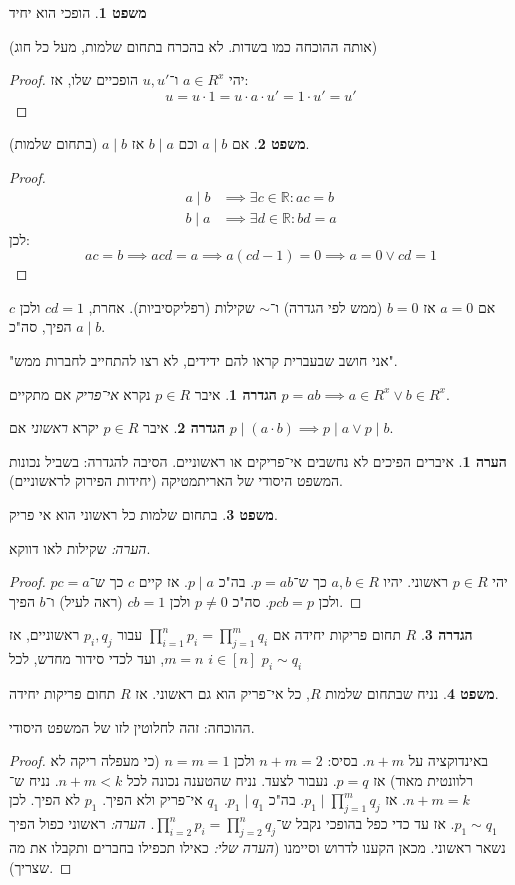 \documentclass[a4paper]{article}
\newcommand\R     {\mathbb{R}}
\newcommand\co        {\colon}
\theoremstyle{definition}
\newtheorem{Theorem}{משפט}
\newtheorem{definition}{הגדרה}
\newtheorem{Remark}{הערה}
\newcommand\theo  [1] {\begin{Theorem}#1\end{Theorem}}
\newcommand\defi  [1] {\begin{definition}#1\end{definition}}
\newcommand\rmark [1] {\begin{Remark}#1\end{Remark}}
\begin{document}
	
	\theo{הופכי הוא יחיד} (אותה ההוכחה כמו בשדות. לא בהכרח בתחום שלמות, מעל כל חוג)\begin{proof}
		יהי $a \in R^x$ ו־$u, u'$ הופכיים שלו, אז:
		\[ u = u \cdot 1 = u \cdot a \cdot u' = 1 \cdot u' = u' \]
	\end{proof}
	\theo{אם $a \mid b$ וכם $b \mid a$ אז $a \mid b$ (בתחום שלמות). }\begin{proof}
		\begin{align*}
			a \mid b &\implies \exists c \in \R \co ac = b \\
			b \mid a &\implies \exists d \in \R\co bd = a
		\end{align*}
		לכן: 
		\[ ac = b \implies acd = a \implies a(cd - 1) = 0 \implies a = 0 \lor cd = 1 \]
	\end{proof}
	אם $a = 0$ אז $b = 0$ (ממש לפי הגדרה) ו־$\sim$ שקילות (רפליקסיביות). אחרת, $cd = 1$ ולכן $c$ הפיך, סה"כ $a \mid b$. 
	
	"אני חושב שבעברית קראו להם ידידים, לא רצו להתחייב לחברות ממש". 
	
	
	\defi{איבר $p \in R$ נקרא \textit{אי־פריק} אם מתקיים $p = ab \implies a \in R^x \lor b \in R^x$. }
	
	\defi{איבר $p \in R$ יקרא \textit{ראשוני} אם $p \mid (a \cdot b) \implies p \mid a \lor p \mid b$. }
	\rmark{איברים הפיכים לא נחשבים אי־פריקים או ראשוניים. הסיבה להגדרה: בשביל נכונות המשפט היסודי של האריתמטיקה (יחידות הפירוק לראשוניים). }
	
	\theo{בתחום שלמות כל ראשוני הוא אי פריק. }
	\textit{הערה: }שקילות לאו דווקא. 
	\begin{proof}
		יהי $p \in R$ ראשוני. יהיו $a, b \in R$ כך ש־$p = ab$. בה"כ $p \mid a$. אז קיים $c$ כך ש־$pc = a$ ולכן $pcb = p$. סה"כ $p \neq 0$ ולכן $cb = 1$ (ראה לעיל) ו־$b$ הפיך. 
	\end{proof}
	\defi{$R$ תחום פריקות יחידה אם $\prod_{i = 1}^{n}p_i = \prod_{j = 1}^{m}q_i$ עבור $p_i, q_j$ ראשוניים, אז $m = n$, ועד לכדי סידור מחדש, לכל $i \in [n]$ $p_i \sim q_i$}
	\theo{נניח שבתחום שלמות $R$, כל אי־פריק הוא גם ראשוני. אז $R$ תחום פריקות יחידה. }
	
	ההוכחה: זהה לחלוטין לזו של המשפט היסודי. \begin{proof}
		באינדוקציה על $n+m$. בסיס: $n + m = 2$ ולכן $n = m = 1$ (כי מעפלה ריקה לא רלוונטית מאוד) אז $p = q$. נעבור לצעד. נניח שהטענה נכונה לכל $n + m < k$. נניח ש־$n + m = k$. אז $p_1 \mid \prod_{j = 1}^{m}q_j$. בה"כ $p_1 \mid q_1$. $q_1$ אי־פריק ולא הפיך. $p_1$ לא הפיך. לכן $p_1 \sim q_1$. אז עד כדי כפל בהופכי נקבל ש־$\prod_{i = 2}^{n} p_i = \prod_{j = 2}^{n} q_j$. \textit{הערה: }ראשוני כפול הפיך נשאר ראשוני. מכאן הקענו לדרוש וסיימנו (\textit{הערה שלי: }כאילו תכפילו בחברים ותקבלו את מה שצריך). 
	\end{proof}
	
\end{document}
